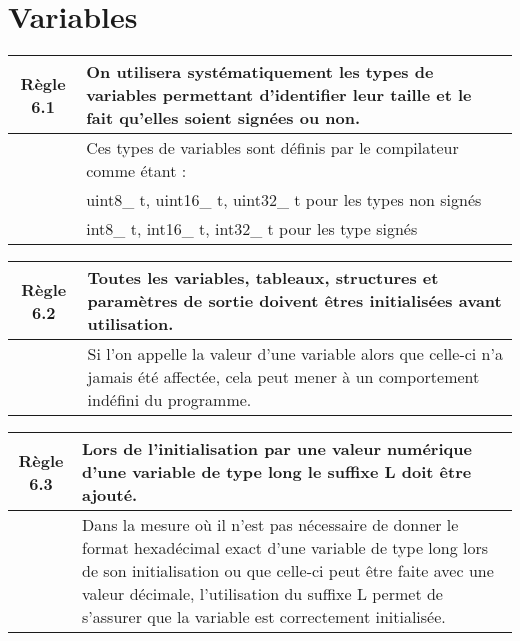 \section{Variables}

\begin{center}
\begin{tabular}{|c p{12.3cm}|}
\hline
\rowcolor{red!10}\textbf{Règle 6.1} & On utilisera systématiquement les types de variables permettant d'identifier leur taille et le fait qu'elles soient signées ou non. \\ \hline
 & Ces types de variables sont définis par le compilateur comme étant : \\
 & uint8\_ t, uint16\_ t, uint32\_ t pour les types non signés \\
 & int8\_ t, int16\_ t, int32\_ t pour les type signés \\ \hline
\hline
\end{tabular}
\end{center}

\medskip

\begin{center}
\begin{tabular}{|c p{12.3cm}|}
\hline
\rowcolor{red!10}\textbf{Règle 6.2} & Toutes les variables, tableaux, structures et paramètres de sortie doivent êtres initialisées avant utilisation. \\ \hline
 & Si l’on appelle la valeur d’une variable alors que celle-ci n’a jamais été affectée, cela peut mener à un comportement indéfini du programme.\\ \hline
\hline
\end{tabular}
\end{center}

\medskip

\begin{center}
\begin{tabular}{|c p{12.3cm}|}
\hline
\rowcolor{red!10}\textbf{Règle 6.3} & Lors de l'initialisation par une valeur numérique d'une variable de type long le suffixe L doit être ajouté. \\ \hline
 & Dans la mesure où il n’est pas nécessaire de donner le format hexadécimal exact d’une variable de type long lors de son initialisation ou que celle-ci peut être faite avec une valeur décimale, l’utilisation du suffixe L permet de s’assurer que la variable est correctement initialisée.\\ \hline
\hline
\end{tabular}
\end{center}

